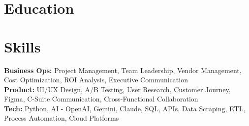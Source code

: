 \documentclass{../templates/simplecv}
\begin{document}
\section{Education}
\resumeItemListStart
{}
\resumeItemListEnd

\vspace{2pt}

\section{Skills}
\vspace{2pt}
\resumeSubHeadingListStart
\small{\item{
\textbf{Business Ops: }{Project Management, Team Leadership, Vendor Management, Cost Optimization, ROI Analysis, Executive Communication} \\ \vspace{1pt}
\textbf{Product: }{UI/UX Design, A/B Testing, User Research, Customer Journey, Figma, C-Suite Communication, Cross-Functional Collaboration} \\ \vspace{1pt}
\textbf{Tech: }{Python, AI - OpenAI, Gemini, Claude, SQL, APIs, Data Scraping, ETL, Process Automation, Cloud Platforms} \\ \vspace{1pt}
}}
\resumeSubHeadingListEnd
\end{document}
